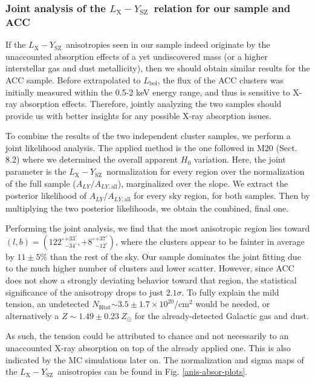 \documentclass{aa}   %
\newcommand{\LY}{$L_{\text{X}}-Y_{\text{SZ}}$}
\newcommand{\nhtot}{$N_{\text{Htot}}$}
\newcommand{\Lbol}{$L_{\text{bol}}$}
\begin{document}
\subsubsection{Joint analysis of the \LY\ relation for our sample and ACC}\label{LYjoint}

If the \LY\ anisotropies seen in our sample indeed originate by the unaccounted absorption effects of a yet undiscovered mass (or a higher interstellar gas and dust metallicity), then we should obtain similar results for the ACC sample. Before extrapolated to \Lbol, the flux of the ACC clusters was initially measured within the 0.5-2 keV energy range, and thus is sensitive to X-ray absorption effects. Therefore, jointly analyzing the two samples should provide us with better insights for any possible X-ray absorption issues.

To combine the results of the two independent cluster samples, we perform a joint likelihood analysis. The applied method is the one followed in M20 (Sect. 8.2) where we determined the overall apparent $H_0$ variation. Here, the joint parameter is the \LY\ normalization for every region over the normalization of the full sample ($A_{LY}/A_{LY,\text{all}}$), marginalized over the slope. We extract the posterior likelihood of $A_{LY}/A_{LY,\text{all}}$ for every sky region, for both samples. Then by multiplying the two posterior likelihoods, we obtain the combined, final one.

Performing the joint analysis, we find that the most anisotropic region lies toward $(l,b)=({122^{\circ}}^{+33^{\circ}}_{-34^{\circ}},{+8^{\circ}}^{+37^{\circ}}_{-12^{\circ}})$, where the clusters appear to be fainter in average by $11\pm 5\%$ than the rest of the sky. Our sample dominates the joint fitting due to the much higher number of clusters and lower scatter. However, since ACC does not show a strongly deviating behavior toward that region, the statistical significance of the anisotropy drops to just $2.1\sigma$. To fully explain the mild tension, an undetected \nhtot$\sim 3.5\pm 1.7\times 10^{20}$/cm$^2$ would be needed, or alternatively a $Z\sim 1.49\pm 0.23\ Z_{\odot}$ for the already-detected Galactic gas and dust.

As such, the tension could be attributed to chance and not necessarily to an unaccounted X-ray absorption on top of the already applied one. This is also indicated by the MC simulations later on. The normalization and sigma maps of the \LY\ anisotropies can be found in Fig. \ref{anis-absor-plots}.
\end{document}
